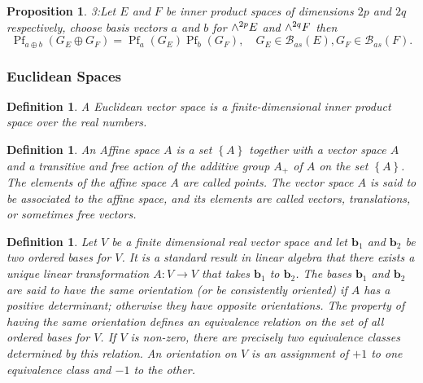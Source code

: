 \documentclass[aps,preprint]{revtex4}%
\newtheorem{definition}[theorem]{Definition}
\newtheorem{proposition}[theorem]{Proposition}
\begin{document}
\begin{proposition}
3:Let $E$ and $F$ be inner product spaces of dimensions $2p$ and $2q$
respectively, choose basis vectors $a$ and $b$ for ${\LARGE \wedge}^{2p}E$ and
${\LARGE \wedge}^{2q}F$ then
\begin{equation}
\operatorname{Pf}_{a\oplus b}\left(  G_{E}\oplus G_{F}\right)
=\operatorname{Pf}_{a}\left(  G_{E}\right)  \operatorname{Pf}_{b}\left(
G_{F}\right)  ,\quad G_{E}\in\mathcal{B}_{as}\left(  E\right)  ,G_{F}%
\in\mathcal{B}_{as}\left(  F\right)  .
\end{equation}

\end{proposition}

\subsubsection{ Euclidean Spaces}

\begin{definition}
A \emph{Euclidean }vector space is a finite-dimensional inner product space
over the real numbers.
\end{definition}

\begin{definition}
An Affine space $A$ is a set $\left\{  A\right\}  $ together with a vector
space $A$ and a transitive and free action of the additive group
$A_{\boldsymbol{+}}$ of $A$ on the set $\left\{  A\right\}  $. The elements of
the affine space $A$ are called points. The vector space $A$ is said to be
associated to the affine space, and its elements are called vectors,
translations, or sometimes free vectors.
\end{definition}

\begin{definition}
Let $V$ be a finite dimensional real vector space and let $\mathbf{b}_{1}$ and
$\mathbf{b}_{2}$ be two ordered bases for $V$. It is a standard result in
linear algebra that there exists a unique linear transformation
$A:V\rightarrow V$ that takes $\mathbf{b}_{1}$ to $\mathbf{b}_{2}$. The bases
$\mathbf{b}_{1}$ and $\mathbf{b}_{2}$ are said to have the same
\emph{orientation} (or be consistently oriented) if $A$ has a positive
determinant; otherwise they have opposite orientations. The property of having
the same orientation defines an equivalence relation on the set of all ordered
bases for $V$. If $V$ is non-zero, there are precisely two equivalence classes
determined by this relation. An orientation on $V$ is an assignment of $+1$ to
one equivalence class and $-1$ to the other.
\end{definition}
\end{document}
